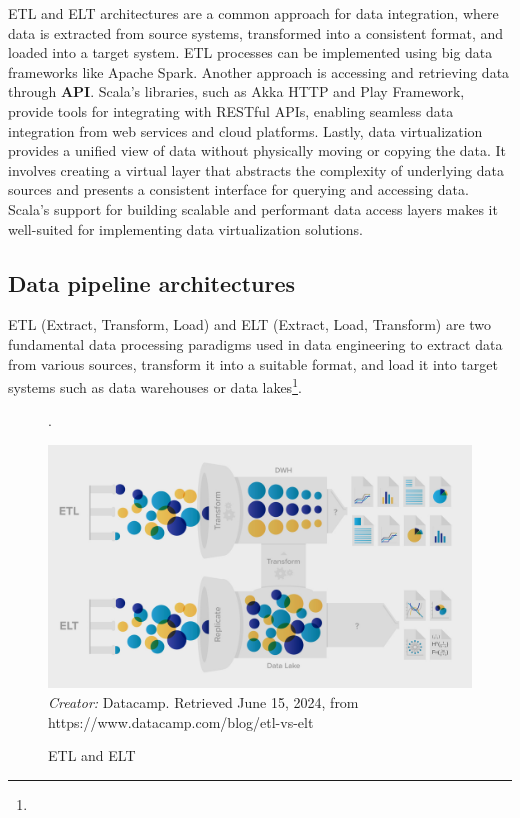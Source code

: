 ETL and ELT architectures are a common approach for data integration, where data is extracted from source systems, transformed into a consistent format, and loaded into a target system. ETL processes can be implemented using big data frameworks like Apache Spark. Another approach is accessing and retrieving data through \textbf{API}. Scala's libraries, such as Akka HTTP and Play Framework, provide tools for integrating with RESTful APIs, enabling seamless data integration from web services and cloud platforms. Lastly, data virtualization provides a unified view of data without physically moving or copying the data. It involves creating a virtual layer that abstracts the complexity of underlying data sources and presents a consistent interface for querying and accessing data. Scala's support for building scalable and performant data access layers makes it well-suited for implementing data virtualization solutions.

\subsection{Data pipeline architectures}

ETL (Extract, Transform, Load) and ELT (Extract, Load, Transform) are two fundamental data processing paradigms used in data engineering to extract data from various sources, transform it into a suitable format, and load it into target systems such as data warehouses or data lakes\footnote[16]{}.

\begin{figure}[H].
\caption{ETL and ELT}
\centering
\includegraphics[width=1\linewidth]{images/image.png}
\small
\textit{Creator:} Datacamp. Retrieved June 15, 2024, from https://www.datacamp.com/blog/etl-vs-elt
\end{figure}


